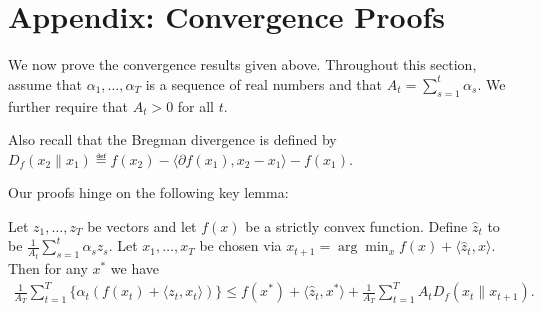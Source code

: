 \documentclass{article} %
\begin{document}



\newpage 

\section*{Appendix: Convergence Proofs} 
\label{sec:proofs}

We now prove the convergence results given above. Throughout this section, assume that $\alpha_1,\ldots,\alpha_T$ is 
a sequence of real numbers and that $A_t = \sum_{s=1}^t \alpha_s$. 
We further require that $A_t > 0$ for all $t$.

Also recall that the Bregman divergence is defined by 
$D_f(x_2 \| x_1) \eqdef f(x_2) - \langle \partial f(x_1), x_2-x_1 \rangle - f(x_1)$.

Our proofs hinge on the following key lemma:

\begin{lemma}
\label{lem:bregman}
Let $z_1,\ldots,z_T$ be vectors and let $f(x)$ be a strictly convex 
function. Define $\hat{z}_t$ to be $\frac{1}{A_t} \sum_{s=1}^t \alpha_s z_s$.
Let $x_1,\ldots,x_T$ be chosen via $x_{t+1} = \arg\min_{x} f(x) + \langle \hat{z}_t, x\rangle$. 
Then for any $x^*$ we have
\begin{align*}
\frac{1}{A_T} \sum_{t=1}^T \{\alpha_t(f(x_t) + \langle z_t, x_t \rangle)\} \leq f(x^*) + \langle \hat{z}_t, x^* \rangle + \frac{1}{A_T} \sum_{t=1}^T A_t D_{f}(x_t \| x_{t+1}). 
\end{align*}
\end{lemma}
\end{document}

